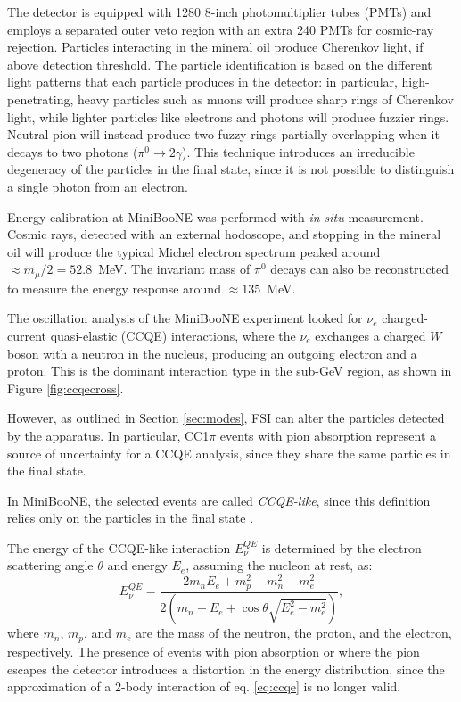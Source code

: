 The detector is equipped with 1280 8-inch photomultiplier tubes (PMTs) and employs a separated outer veto region with an extra 240 PMTs for cosmic-ray rejection. Particles interacting in the mineral oil produce Cherenkov light, if above detection threshold. The particle identification is based on the different light patterns that each particle produces in the detector: in particular, high-penetrating, heavy particles such as muons will produce sharp rings of Cherenkov light, while lighter particles like electrons and photons will produce fuzzier rings. Neutral pion will instead produce two fuzzy rings partially overlapping when it decays to two photons ($\pi^{0}\rightarrow 2\gamma$). 
This technique introduces an irreducible degeneracy of the particles in the final state, since it is not possible to distinguish a single photon from an electron. 

Energy calibration at MiniBooNE was performed with \emph{in situ} measurement. Cosmic rays, detected with an external hodoscope, and stopping in the mineral oil will produce the typical Michel electron spectrum peaked around $\approx m_{\mu}/2 = 52.8$~MeV. The invariant mass of $\pi^0$ decays can also be reconstructed to measure the energy response around $\approx135$~MeV. 

The oscillation analysis of the MiniBooNE experiment looked for $\nu_e$ charged-current quasi-elastic (CCQE) interactions, where the $\nu_{e}$ exchanges a charged $W$ boson with a neutron in the nucleus, producing an outgoing electron and a proton. This is the dominant interaction type in the sub-GeV region, as shown in Figure \ref{fig:ccqecross}.

However, as outlined in Section \ref{sec:modes}, FSI can alter the particles detected by the apparatus. In particular, CC1$\pi$ events with pion absorption represent a source of uncertainty for a CCQE analysis, since they share the same particles in the final state.

In MiniBooNE, the selected events are called \emph{CCQE-like}, since this definition relies only on the particles in the final state \cite{Katori:2013nca}. 

The energy of the CCQE-like interaction $E_{\nu}^{QE}$ is determined by the electron scattering angle $\theta$ and energy $E_e$, assuming the nucleon at rest, as:
\begin{equation}
    E_{\nu}^{QE} = \frac{2m_n E_e + m_p^2- m_n^2 - m_e^2}{2(m_n - E_e + \cos\theta\sqrt{E_e^2-m_e^2})},\label{eq:ccqe}
\end{equation}
where $m_n$, $m_p$, and $m_e$ are the mass of the neutron, the proton, and the electron, respectively. The presence of events with pion absorption or where the pion escapes the detector introduces a distortion in the energy distribution, since the approximation of a 2-body interaction of eq. \ref{eq:ccqe} is no longer valid.

